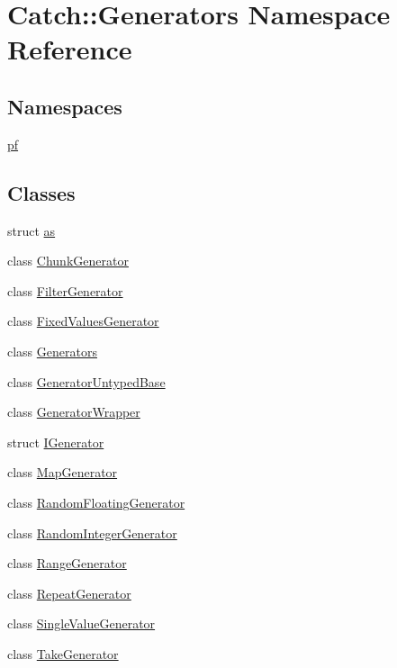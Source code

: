\hypertarget{namespace_catch_1_1_generators}{}\section{Catch\+::Generators Namespace Reference}
\label{namespace_catch_1_1_generators}
\subsection*{Namespaces}
\begin{DoxyCompactItemize}
\item 
 \mbox{\hyperlink{namespace_catch_1_1_generators_1_1pf}{pf}}
\end{DoxyCompactItemize}
\subsection*{Classes}
\begin{DoxyCompactItemize}
\item 
struct \mbox{\hyperlink{struct_catch_1_1_generators_1_1as}{as}}
\item 
class \mbox{\hyperlink{class_catch_1_1_generators_1_1_chunk_generator}{Chunk\+Generator}}
\item 
class \mbox{\hyperlink{class_catch_1_1_generators_1_1_filter_generator}{Filter\+Generator}}
\item 
class \mbox{\hyperlink{class_catch_1_1_generators_1_1_fixed_values_generator}{Fixed\+Values\+Generator}}
\item 
class \mbox{\hyperlink{class_catch_1_1_generators_1_1_generators}{Generators}}
\item 
class \mbox{\hyperlink{class_catch_1_1_generators_1_1_generator_untyped_base}{Generator\+Untyped\+Base}}
\item 
class \mbox{\hyperlink{class_catch_1_1_generators_1_1_generator_wrapper}{Generator\+Wrapper}}
\item 
struct \mbox{\hyperlink{struct_catch_1_1_generators_1_1_i_generator}{I\+Generator}}
\item 
class \mbox{\hyperlink{class_catch_1_1_generators_1_1_map_generator}{Map\+Generator}}
\item 
class \mbox{\hyperlink{class_catch_1_1_generators_1_1_random_floating_generator}{Random\+Floating\+Generator}}
\item 
class \mbox{\hyperlink{class_catch_1_1_generators_1_1_random_integer_generator}{Random\+Integer\+Generator}}
\item 
class \mbox{\hyperlink{class_catch_1_1_generators_1_1_range_generator}{Range\+Generator}}
\item 
class \mbox{\hyperlink{class_catch_1_1_generators_1_1_repeat_generator}{Repeat\+Generator}}
\item 
class \mbox{\hyperlink{class_catch_1_1_generators_1_1_single_value_generator}{Single\+Value\+Generator}}
\item 
class \mbox{\hyperlink{class_catch_1_1_generators_1_1_take_generator}{Take\+Generator}}
\end{DoxyCompactItemize}
